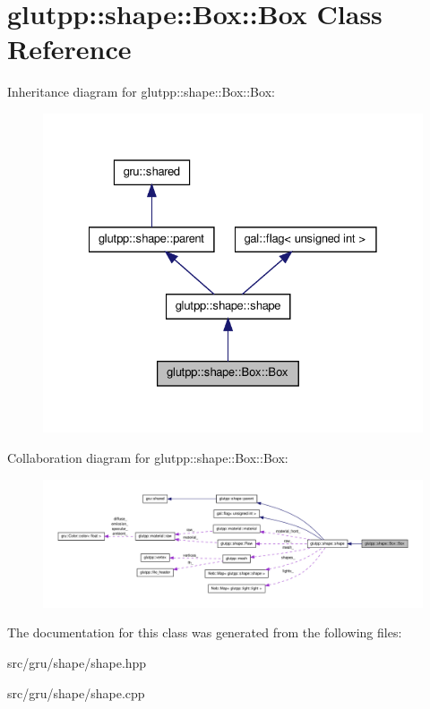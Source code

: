 \hypertarget{classglutpp_1_1shape_1_1Box_1_1Box}{\section{glutpp\-:\-:shape\-:\-:\-Box\-:\-:\-Box \-Class \-Reference}
\label{classglutpp_1_1shape_1_1Box_1_1Box}
}


\-Inheritance diagram for glutpp\-:\-:shape\-:\-:\-Box\-:\-:\-Box\-:
\nopagebreak
\begin{figure}[H]
\begin{center}
\leavevmode
\includegraphics[width=328pt]{classglutpp_1_1shape_1_1Box_1_1Box__inherit__graph}
\end{center}
\end{figure}


\-Collaboration diagram for glutpp\-:\-:shape\-:\-:\-Box\-:\-:\-Box\-:
\nopagebreak
\begin{figure}[H]
\begin{center}
\leavevmode
\includegraphics[width=350pt]{classglutpp_1_1shape_1_1Box_1_1Box__coll__graph}
\end{center}
\end{figure}


\-The documentation for this class was generated from the following files\-:\begin{DoxyCompactItemize}
\item 
src/gru/shape/shape.\-hpp\item 
src/gru/shape/shape.\-cpp\end{DoxyCompactItemize}
